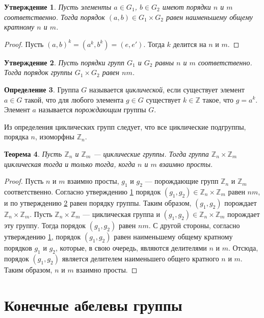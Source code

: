 \documentclass[12pt, titlepage, oneside]{amsbook}
\newcommand{\ZZ}{\mathbb{Z}}
\newtheorem{theorem}{Теорема}[chapter]
\newtheorem{claim}[theorem]{Утверждение}
\theoremstyle{definition}
\newtheorem{definition}[theorem]{Определение}
\theoremstyle{remark}
\begin{document}
\begin{claim}
	\label{Proizv5} Пусть элементы $a\in G_1$, $b\in G_2$ имеют порядки $n$ и $m$ соответственно. Тогда порядок $(a,b)\in G_1\times G_2$ равен наименьшему общему кратному $n$ и $m$.
\end{claim}

\begin{proof}
	Пусть $(a,b)^k=(a^k,b^k)=(e,e')$. Тогда $k$ делится на $n$ и $m$.
\end{proof}

\begin{claim}
	\label{Proizv6} Пусть порядки групп $G_1$ и $G_2$ равны $n$ и $m$ соответственно. Тогда порядок группы $G_1\times G_2$ равен $nm$.
\end{claim}

\begin{definition}
	Группа $G$ называется \emph{циклической}, если существует элемент
	$a\in G$ такой, что для любого элемента $g\in G$ существует
	$k\in\ZZ$ такое, что $g=a^k$. Элемент $a$ называется
	\emph{порождающим} группы $G$.
\end{definition}

Из определения циклических групп следует, что все циклические
подгруппы, порядка $n$, изоморфны $\ZZ_n$.


\begin{theorem}
	\label{Proizv7} Пусть $\ZZ_n$ и $\ZZ_m$ --- циклические группы. Тогда группа $\ZZ_n\times\ZZ_m$ циклическая тогда и только тогда, когда $n$ и $m$ взаимно просты.
\end{theorem}

\begin{proof}
	Пусть $n$ и $m$ взаимно просты, $g_1$ и $g_2$ --- порождающие групп $\ZZ_n$ и $\ZZ_m$ соответственно. Согласно утверждению \ref{Proizv5} порядок $(g_1,g_2)\in\ZZ_n\times\ZZ_m$ равен $nm$, и по утверждению \ref{Proizv6} равен порядку группы. Таким образом, $(g_1,g_2)$ порождает $\ZZ_n\times\ZZ_m$. Пусть $\ZZ_n\times\ZZ_m$ --- циклическая группа и $(g_1,g_2)\in\ZZ_n\times\ZZ_m$ порождает эту группу. Тогда порядок $(g_1,g_2)$ равен $nm$. С другой стороны, согласно утверждению \ref{Proizv5}, порядок $(g_1,g_2)$ равен наименьшему общему кратному порядков $g_1$ и $g_2$, которые, в свою очередь, являются делителями $n$ и $m$. Отсюда, порядок $(g_1,g_2)$ является делителем наименьшего общего кратного $n$ и $m$. Таким образом, $n$ и $m$ взаимно просты.
\end{proof}

\section{Конечные абелевы группы}
\end{document}
